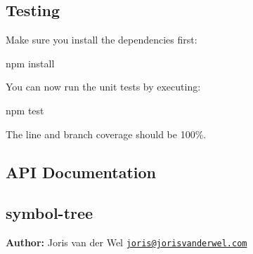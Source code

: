\subsection*{Testing }

Make sure you install the dependencies first\+: \begin{DoxyVerb}npm install
\end{DoxyVerb}


You can now run the unit tests by executing\+: \begin{DoxyVerb}npm test
\end{DoxyVerb}


The line and branch coverage should be 100\%.

\subsection*{A\+PI Documentation }

\label{_module_symbol-tree}%


\subsection*{symbol-\/tree}

{\bfseries Author\+:} Joris van der Wel \href{mailto:joris@jorisvanderwel.com}{\tt joris@jorisvanderwel.\+com}


